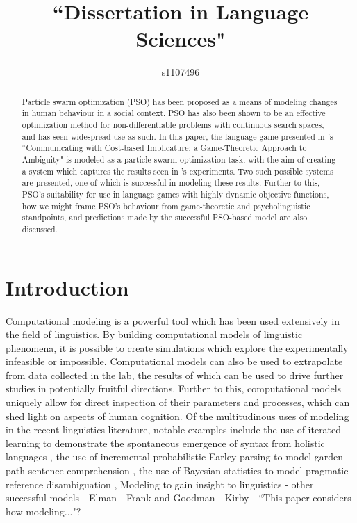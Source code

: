 \documentclass[12pt]{article}
\begin{document}
\title{``Dissertation in Language Sciences"}
\author{s1107496}

\maketitle

\begin{abstract}
Particle swarm optimization (PSO) has been proposed as a means of modeling changes in human behaviour in a social context. PSO has also been shown to be an effective optimization method for non-differentiable problems with continuous search spaces, and has seen widespread use as such. In this paper, the language game presented in \citeauthor{rohde2012}'s ``Communicating with Cost-based Implicature: a Game-Theoretic Approach to Ambiguity" is modeled as a particle swarm optimization task, with the aim of creating a system which captures the results seen in \citeauthor{rohde2012}'s experiments. Two such possible systems are presented, one of which is successful in modeling these results. Further to this, PSO's suitability for use in language games with highly dynamic objective functions, how we might frame PSO's behaviour from game-theoretic and psycholinguistic standpoints, and predictions made by the successful PSO-based model are also discussed.
\end{abstract}



\section{Introduction}
Computational modeling is a powerful tool which has been used extensively in the field of linguistics. By building computational models of linguistic phenomena, it is possible to create simulations which explore the experimentally infeasible or impossible. Computational models can also be used to extrapolate from data collected in the lab, the results of which can be used to drive further studies in potentially fruitful directions. Further to this, computational models uniquely allow for direct inspection of their parameters and processes, which can shed light on aspects of human cognition. Of the multitudinous uses of modeling in the recent linguistics literature, notable examples include the use of iterated learning to demonstrate the spontaneous emergence of syntax from holistic languages \citep{kirby2002}, the use of incremental probabilistic Earley parsing to model garden-path sentence comprehension \citep{hale2001}, the use of Bayesian statistics to model pragmatic reference disambiguation \citep{frank2012},
Modeling to gain insight to linguistics - other successful models - Elman - Frank and Goodman - Kirby - ``This paper considers how modeling..."?
\end{document}
